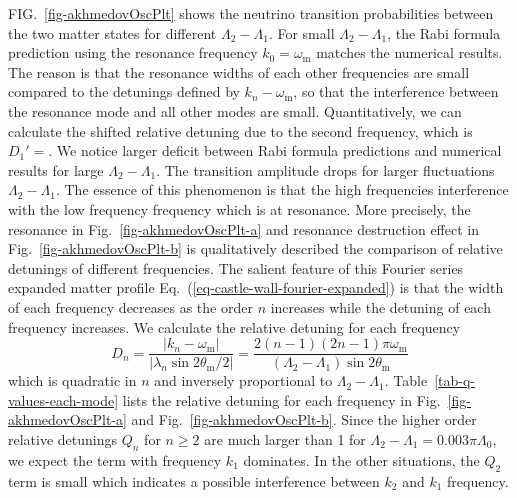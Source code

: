 \documentclass[%
reprint,
 amsmath,amssymb,
 prd,
]{revtex4-1}
\newcommand{\RD}{D}
\begin{document}
FIG.~\ref{fig-akhmedovOscPlt} shows the neutrino transition probabilities between the two matter states for different $\Lambda_2-\Lambda_1$. For small $\Lambda_2-\Lambda_1$, the Rabi formula prediction using the resonance frequency $k_0=\omega_{\mathrm m}$ matches the numerical results. The reason is that the resonance widths of each other frequencies are small compared to the detunings defined by $k_n-\omega_{\mathrm m}$, so that the interference between the resonance mode and all other modes are small. Quantitatively, we can calculate the shifted relative detuning due to the second frequency, which is $\RD_1'=$. We notice larger deficit between Rabi formula predictions and numerical results for large $\Lambda_2-\Lambda_1$. The transition amplitude drops for larger fluctuations $\Lambda_2-\Lambda_1$. The essence of this phenomenon is that the high frequencies interference with the low frequency frequency which is at resonance. More precisely, the resonance in Fig.~\ref{fig-akhmedovOscPlt-a} and resonance destruction effect in Fig.~\ref{fig-akhmedovOscPlt-b} is qualitatively described the comparison of relative detunings of different frequencies. The salient feature of this Fourier series expanded matter profile Eq.~(\ref{eq-castle-wall-fourier-expanded}) is that the width of each frequency decreases as the order $n$ increases while the detuning of each frequency increases. We calculate the relative detuning for each frequency
\begin{equation}
\RD_n = \frac{\lvert k_n -\omega_{\mathrm m} \rvert}{ \lvert \lambda_n  \sin 2\theta_{\mathrm m}/2 \rvert } = \frac{2(n-1)(2n-1)\pi \omega_{\mathrm m}}{(\Lambda_2 - \Lambda_1)\sin 2\theta_{\mathrm m}}
\end{equation}
which is quadratic in $n$ and inversely proportional to $\Lambda_2-\Lambda_1$. Table~\ref{tab-q-values-each-mode} lists the relative detuning for each frequency in Fig.~\ref{fig-akhmedovOscPlt-a} and Fig.~\ref{fig-akhmedovOscPlt-b}. Since the higher order relative detunings $Q_n$ for $n\geq 2$ are much larger than 1 for $\Lambda_2-\Lambda_1 = 0.003\pi\Lambda_0$, we expect the term with frequency $k_1$ dominates. In the other situations, the $Q_2$ term is small which indicates a possible interference between $k_2$ and $k_1$ frequency. 
\end{document}
